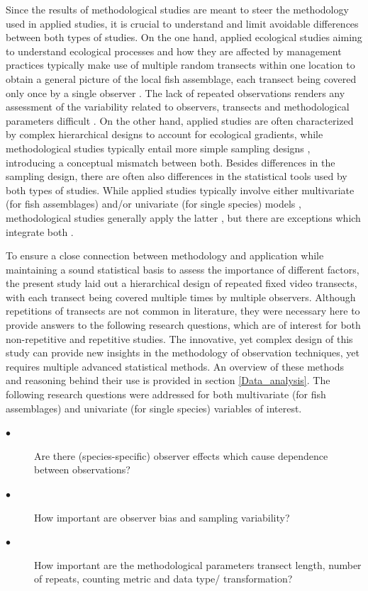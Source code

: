 \documentclass[10pt,letterpaper]{article}
\begin{document}
Since the results of methodological studies are meant to steer the methodology used in applied studies, it is crucial to understand and limit avoidable differences between both types of studies. On the one hand, applied ecological studies aiming to understand ecological processes and how they are affected by management practices typically make use of multiple random transects within one location to obtain a general picture of the local fish assemblage, each transect being covered only once by a single observer \cite{Denny2003,Labrosse2002,Ruttenberg2005}. The lack of repeated observations renders any assessment of the variability related to observers, transects and methodological parameters difficult \cite{Katsanevakis2012}. On the other hand, applied studies are often characterized by complex hierarchical designs to account for ecological gradients, while methodological studies typically entail more simple sampling designs \cite{Bijoux2013a,Dickens2011,Watson2005}, introducing a conceptual mismatch between both.
Besides differences in the sampling design, there are often also differences in the statistical tools used by both types of studies. While applied studies typically involve either multivariate (for fish assemblages) and/or univariate (for single species) models \cite{Andradi-Brown2016,Denny2003,Samoilys2000,Zintzen2012}, methodological studies generally apply the latter \cite{Pelletier2012,Edgar2004,Langlois2010,Thompson1997}, but there are exceptions which integrate both \cite{Cappo2011,Gladstone2012,Lindfield2014}. 

To ensure a close connection between methodology and application while maintaining a sound statistical basis to assess the importance of different factors, the present study laid out a hierarchical design of repeated fixed video transects, with each transect being covered multiple times by multiple observers. Although repetitions of transects are not common in literature, they were necessary here to provide answers to the following research questions, which are of interest for both non-repetitive and repetitive studies. The innovative, yet complex design of this study can provide new insights in the methodology of observation techniques, yet requires multiple advanced statistical methods. An overview of these methods and reasoning behind their use is provided in section \ref{Data_analysis}. The following research questions were addressed for both multivariate (for fish assemblages) and univariate (for single species) variables of interest.

\begin{description}
  \item[$\bullet$] Are there (species-specific) observer effects which cause dependence between observations?
  \item[$\bullet$] How important are observer bias and sampling variability? 
  \item[$\bullet$] How important are the methodological parameters transect length, number of repeats, counting metric and data type/ transformation? 
\end{description}
\end{document}
